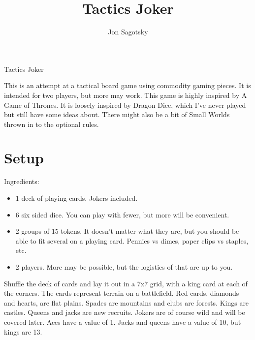 \documentclass{article}
\title{Tactics Joker}
\author{Jon Sagotsky}
\begin{document}
\maketitle
%
%
\def \maxarmy {6 }            %
\def \reinforcements {15 }    %
\def \recruitroll {6 }        %


Tactics Joker

This is an attempt at a tactical board game using commodity gaming pieces.  It is intended for two players, but more may work.  This game is highly inspired by A Game of Thrones.  It is loosely inspired by Dragon Dice, which I've never played but still have some ideas about.  There might also be a bit of Small Worlds thrown in to the optional rules.


\section{Setup}

Ingredients: 
\begin{itemize}
  \item 1 deck of playing cards.  Jokers included.
  \item 6 six sided dice.  You can play with fewer, but more will be convenient.
  \item 2 groups of \reinforcements tokens.  It doesn't matter what they are, but you should be able to fit several on a playing card.  Pennies vs dimes, paper clips vs staples, etc.
  \item 2 players.  More may be possible, but the logistics of that are up to you.
\end{itemize}

Shuffle the deck of cards and lay it out in a 7x7 grid, with a king card at each of the corners.  The cards represent terrain on a battlefield.  Red cards, diamonds and hearts, are flat plains.  Spades are mountains and clubs are forests.  Kings are castles.  Queens and jacks are new recruits.  Jokers are of course wild and will be covered later.  Aces have a value of 1.  Jacks and queens have a value of 10, but kings are 13.
\end{document}
